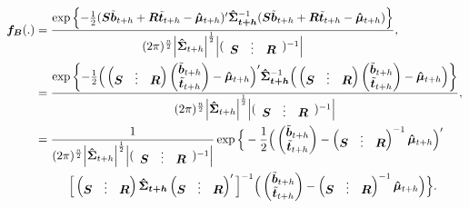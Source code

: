 \documentclass[a4paper, 11pt]{article}
\begin{document}
\begin{align*}
\bm{f_B}(.)
& =
\frac{\exp\left\{-\frac{1}{2}(\bm{S}\tilde{\bm{b}}_{t+h}+\bm{R}\tilde{\bm{t}}_{t+h}-\bm{\hat{\mu}}_{t+h})' \bm{\hat{\Sigma}_{t+h}}^{-1}(\bm{S}\tilde{\bm{b}}_{t+h}+\bm{R}\tilde{\bm{t}}_{t+h}-\bm{\hat{\mu}}_{t+h})\right\}}{(2\pi)^{\frac{n}{2}}\Big|\bm{\hat{\Sigma}}_{t+h}\Big|^{\frac{1}{2}}\Big|(\begin{array}{ccc}\bm{S} & \vdots& \bm{R}\end{array})^{-1} \Big|},\\
& =
\frac{\exp\left\{-\frac{1}{2}\Big(\begin{pmatrix}\bm{S} & \vdots& \bm{R}\end{pmatrix}\begin{pmatrix}\tilde{\bm{b}}_{t+h}\\ \tilde{\bm{t}}_{t+h}\end{pmatrix}-\bm{\hat{\mu}}_{t+h}\Big)' \bm{\hat{\Sigma}_{t+h}}^{-1}\Big(\begin{pmatrix}\bm{S} & \vdots& \bm{R}\end{pmatrix}\begin{pmatrix}\tilde{\bm{b}}_{t+h}\\ \tilde{\bm{t}}_{t+h}\end{pmatrix}-\bm{\hat{\mu}}_{t+h}\Big)\right\}}{(2\pi)^{\frac{n}{2}}\Big|\bm{\hat{\Sigma}}_{t+h}\Big|^{\frac{1}{2}}\Big|(\begin{array}{ccc}\bm{S} & \vdots& \bm{R}\end{array})^{-1} \Big|},\\
& =
\frac{1}{(2\pi)^{\frac{n}{2}}\Big|\bm{\hat{\Sigma}}_{t+h}\Big|^{\frac{1}{2}}\Big|(\begin{array}{ccc}\bm{S} & \vdots& \bm{R}\end{array})^{-1} \Big|}
\exp \Big\{-\frac{1}{2}\Big(\begin{pmatrix}\tilde{\bm{b}}_{t+h}\\ \tilde{\bm{t}}_{t+h}\end{pmatrix}-\begin{pmatrix}\bm{S} & \vdots& \bm{R}\end{pmatrix}^{-1}\bm{\hat{\mu}}_{t+h}\Big)'\\
& \hspace*{1cm} \Big[\begin{pmatrix}\bm{S} & \vdots& \bm{R}\end{pmatrix}\bm{\hat{\Sigma}_{t+h}}\begin{pmatrix}\bm{S} & \vdots& \bm{R}\end{pmatrix}'\Big]^{-1}
\Big(\begin{pmatrix}\tilde{\bm{b}}_{t+h}\\ \tilde{\bm{t}}_{t+h}\end{pmatrix}-\begin{pmatrix}\bm{S} & \vdots& \bm{R}\end{pmatrix}^{-1}\bm{\hat{\mu}}_{t+h}\Big) \Big\}.
\end{align*}
\end{document}
